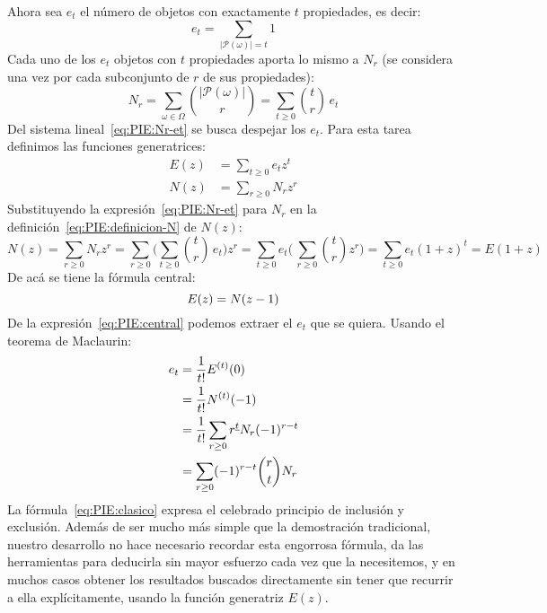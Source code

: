   Ahora sea \(e_t\)
  el número de objetos con exactamente \(t\) propiedades,
  es decir:
  \begin{equation}
    \label{eq:PIE:definiciom-et}
    e_t
      = \sum_{\lvert \mathcal{P}(\omega) \rvert = t} 1
  \end{equation}
  Cada uno de los \(e_t\) objetos con \(t\) propiedades
  aporta lo mismo a \(N_r\)
  (se considera una vez
   por cada subconjunto de \(r\) de sus propiedades):
  \begin{equation}
    \label{eq:PIE:Nr-et}
    N_r
      = \sum_{\omega \in \Omega}
	  \binom{\lvert \mathcal{P}(\omega) \rvert}{r}
      = \sum_{t \ge 0} \binom{t}{r} \, e_t
  \end{equation}
  Del sistema lineal~\eqref{eq:PIE:Nr-et}
  se busca
  despejar los \(e_t\).
  Para esta tarea definimos las funciones generatrices:%
  \begin{align}
    \label{eq:PIE:definicion-E}
    E(z)
      &= \sum_{t \ge 0} e_t z^t \\
    \label{eq:PIE:definicion-N}
    N(z)
      &= \sum_{r \ge 0} N_r z^r
  \end{align}
  Substituyendo la expresión~\eqref{eq:PIE:Nr-et} para \(N_r\)
  en la definición~\eqref{eq:PIE:definicion-N} de \(N(z)\):
  \begin{equation*}
    N(z)
      = \sum_{r \ge 0} N_r z^r
      = \sum_{r \ge 0}
	  \biggl(
	    \sum_{t \ge 0} \binom{t}{r} \, e_t
	  \biggr) z^r
      = \sum_{t \ge 0} e_t
	  \biggl(\,
	    \sum_{r \ge 0} \binom{t}{r} z^r
	  \biggr)
      = \sum_{t \ge 0} e_t (1 + z)^t
      = E(1 + z)
  \end{equation*}
  De acá se tiene la fórmula central:
  \begin{equation}
    \label{eq:PIE:central}
    \index{inclusion y exclusion, principio de@inclusión y exclusión, principio de!formula central@fórmula central|textbfhy}
    E(z)
      = N(z - 1)
  \end{equation}
  De la expresión~\eqref{eq:PIE:central}
  podemos extraer el \(e_t\) que se quiera.
  Usando el teorema de Maclaurin:
  \begin{align}
    e_t
      &= \frac{1}{t!} E^{(t)}(0) \\
      &= \frac{1}{t!} N^{(t)}(-1) \\
      &= \frac{1}{t!} \sum_{r \ge 0}
			r^{\underline{t}} N_r (-1)^{r - t} \\
      &= \sum_{r \ge 0} (-1)^{r - t} \binom{r}{t} N_r
	   \label{eq:PIE:clasico}
	   \index{inclusion y exclusion, principio de@inclusión y exclusión, principio de!formula clasica@fórmula clásica}
  \end{align}
  La fórmula~\eqref{eq:PIE:clasico}
  expresa el celebrado principio de inclusión y exclusión.
  Además de ser mucho más simple que la demostración tradicional,
  nuestro desarrollo
  no hace necesario recordar esta engorrosa fórmula,
  da las herramientas para deducirla sin mayor esfuerzo
  cada vez que la necesitemos,
  y en muchos casos obtener los resultados buscados directamente
  sin tener que recurrir a ella explícitamente,
  usando la función generatriz \(E(z)\).

